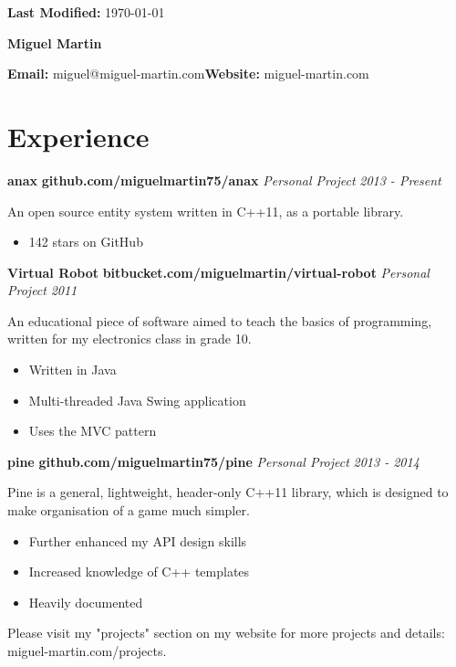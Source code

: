 \documentclass[10pt,oneside,a4paper]{article}
\newcommand{\project}[5] 
{
    {
    \textbf{#1} \hfill {\footnotesize\textbf{#2}}\newline
    \emph{#3} \hfill \emph{#4}
    }

    {
        \begin{description}[leftmargin=0.5cm, itemindent=0cm]
        \item {#5}
        \end{description}
    }
}
\newcommand{\info}[2] 
{
    {
        \section*{#1}
        \hrulefill\newline
    }

    {#2}
}
\begin{document}
{
    \raggedleft
    \footnotesize
    \textbf{Last Modified:} \today

    \centering
    {\huge\textbf{Miguel Martin}}

    \textbf{Email:} miguel@miguel-martin.com\hfill\textbf{Website:} miguel-martin.com\newline

}

\info{Experience}
{
    {
        \project{anax}{github.com/miguelmartin75/anax}
        {Personal Project}{2013 - Present}
        {
            An open source entity system written in C++11, as a portable library.
            \begin{itemize}
                \item 142 stars on GitHub
            \end{itemize}
        }
        \project{Virtual Robot}{bitbucket.com/miguelmartin/virtual-robot}
        {Personal Project}{2011}
        {
            An educational piece of software aimed to teach the basics of programming,
            written for my electronics class in grade 10.
            \begin{itemize}
                \item Written in Java
                \item Multi-threaded Java Swing application
                \item Uses the MVC pattern
            \end{itemize}
        }
        \project{pine}{github.com/miguelmartin75/pine}
        {Personal Project}{2013 - 2014}
        {
            Pine is a general, lightweight, header-only C++11 library, which is designed to make organisation of a game much simpler. 
            \begin{itemize}
                \item Further enhanced my API design skills
                \item Increased knowledge of C++ templates
                \item Heavily documented
            \end{itemize}
        }
        Please visit my "projects" section on my website for more projects and details: miguel-martin.com/projects.
    }
}
\end{document}
